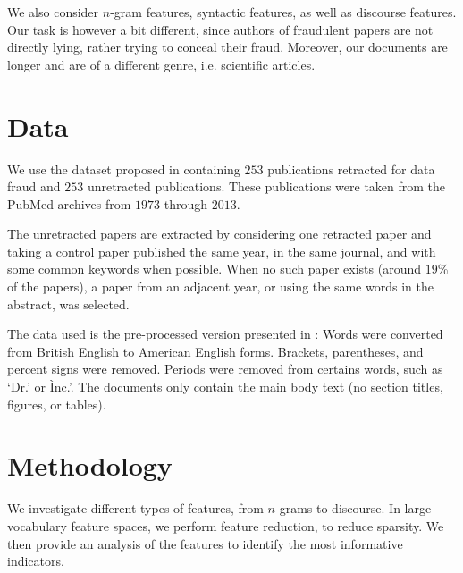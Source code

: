 \documentclass[11pt,letterpaper]{article}
\begin{document}
We also consider $n$-gram features, syntactic features, as well as discourse features.
Our task is however a bit different, since authors of fraudulent papers are not directly lying, rather trying to conceal their fraud.
Moreover, our documents are longer and are of a different genre, i.e. scientific articles.



\section{Data}
\label{sec:data}


We use the dataset proposed in \cite{markowitz_linguistic_2015} containing $253$ publications retracted for data fraud and $253$ unretracted publications. 
These publications were taken from the PubMed archives from $1973$ through $2013$.



The unretracted papers are extracted by considering one retracted paper and taking a control paper published the same year, in the same journal, and with some common keywords when possible. 
When no such paper exists (around $19$\% of the papers), a paper from an adjacent year, or using the same words in the abstract, was selected.


The data used is the pre-processed version presented in \cite{markowitz_linguistic_2015}: Words were converted from British English to American English forms. Brackets, parentheses, and percent signs were removed. Periods were removed from certains words, such as `Dr.' or Ìnc.'.
The documents only contain the main body text (no section titles, figures, or tables).


\section{Methodology}

We investigate different types of features, from $n$-grams to discourse.
In large vocabulary feature spaces, we perform feature reduction, to reduce sparsity.
We then provide an analysis of the features to identify the most informative indicators.
\end{document}
